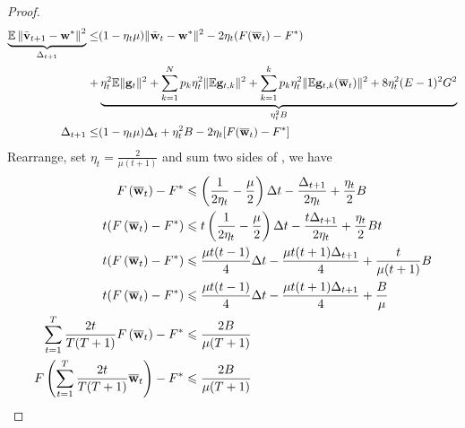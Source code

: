 \begin{proof}
\begin{align}
	\underbrace{\mathbb{E}\left\|\bar{{\mathbf{v}}}_{t+1}-{\mathbf{w}}^{*}\right\|^2}_{\Delta_{t+1}} \leq &  (1 - \eta_t\mu)\|\bar{{\mathbf{w}}}_{t}-{\mathbf{w}}^{*}\|^{2} -2 \eta_{t}(F({\overline{\mathbf{w}}}_{t})- F^{*})\\
	+ & \underbrace{\eta_{t}^{2} \mathbb{E}\| {\mathbf{g}}_{t} \|^{2} +  \sum_{k=1}^N p_k \eta_t^2 \|\mathbb{E} {\mathbf{g}}_{t,k}\|^2  + \sum_{k=1}^{k} p_{k}\eta_{t}^{2}\|\mathbb{E} {\mathbf{g}}_{t,k}({\overline{\mathbf{w}}}_{t})\|^{2} + 8\eta_t^2 (E-1)^2 G^2}_{\eta_t^2 B} \label{eq:scvxnsmth4} \\
	\Delta_{t+1}  \leq &  (1 - \eta_t\mu) \Delta_t + \eta^2_t B - 2 \eta_t [F({\overline{\mathbf{w}}}_{t})- F^{*}] \label{eq:scvxnsmth5}\\
\end{align}
Rearrange, set $\eta_t = \frac{2}{\mu(t+1)} $ and sum two sides of \eq{\ref{eq:scvxnsmth5}}, we have
\begin{align}
F\left({\overline{\mathbf{w}}}_{t}\right)-F^{*} &\leqslant \left(\frac{1}{2 \eta_{t}}-\frac{\mu}{2}\right) \Delta t-\frac{\Delta_{t+1}}{2 \eta_{t}}+\frac{\eta_{t}}{2} B\\
t(F\left({\overline{\mathbf{w}}}_{t}\right)-F^{*}) & \leqslant t\left(\frac{1}{2 \eta_{t}}-\frac{\mu}{2}\right) \Delta t-\frac{t\Delta_{t+1}}{2 \eta_{t}}+\frac{\eta_{t}}{2} Bt\\
t(F\left({\overline{\mathbf{w}}}_{t}\right)-F^{*}) & \leqslant \frac{\mu t(t-1)}{4} \Delta t- \frac{\mu t(t+1)\Delta_{t+1}}{4}+\frac{t}{\mu(t+1)} B\\
t(F\left({\overline{\mathbf{w}}}_{t}\right)-F^{*}) & \leqslant \frac{\mu t(t-1)}{4} \Delta t- \frac{\mu t(t+1)\Delta_{t+1}}{4}+\frac{B}{\mu}\\
\sum_{t=1}^T \frac{2t}{T(T+1)}F\left({\overline{\mathbf{w}}}_{t}\right)-F^{*} & \leqslant \frac{2B}{\mu(T+1)} \\
F\left(\sum_{t=1}^T \frac{2t}{T(T+1)} {\overline{\mathbf{w}}}_{t}\right)-F^{*} & \leqslant \frac{2B}{\mu(T+1)} 
\end{align}


\end{proof}